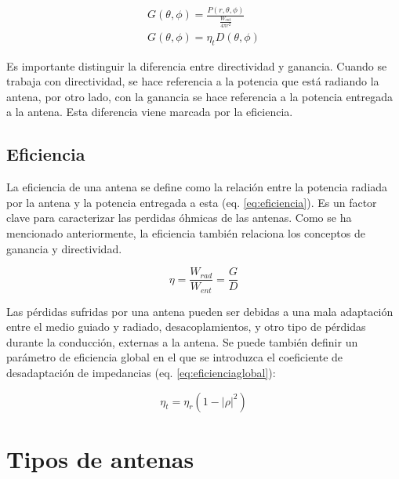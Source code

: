 \begin{subequations}
	\begin{eqnarray}
		G(\theta, \phi)=\frac{P(r,\theta, \phi)}{\frac{W_{ent}}{4\pi r^2}} \label{eq:ganancia} \\ %
		G(\theta, \phi)=\eta_{t} D(\theta, \phi) \label{eq:ganaciadirect}
	\end{eqnarray}
\end{subequations}

\par Es importante distinguir la diferencia entre directividad y ganancia. Cuando se trabaja con directividad, se hace referencia a la potencia que está radiando la antena, por otro lado, con la ganancia se hace referencia a la potencia entregada a la antena. Esta diferencia viene marcada por la eficiencia.

\subsection{Eficiencia}

\par La eficiencia de una antena se define como la relación entre la potencia radiada por la antena y la potencia entregada a esta (eq. \ref{eq:eficiencia}). Es un factor clave para caracterizar las perdidas óhmicas de las antenas. Como se ha mencionado anteriormente, la eficiencia también relaciona los conceptos de ganancia y directividad.

\begin{equation}
	\eta = \frac{W_{rad}}{W_{ent}}= \frac{G}{D}
	\label{eq:eficiencia}
\end{equation}

\par Las pérdidas sufridas por una antena pueden ser debidas a una mala adaptación entre el medio guiado y radiado, desacoplamientos, y otro tipo de pérdidas durante la conducción, externas a la antena. Se puede también definir un parámetro de eficiencia global en el que se introduzca el coeficiente de desadaptación de impedancias (eq. \ref{eq:eficienciaglobal}):

\begin{equation}
	\eta _{t}=\eta _{r}(1-\left | \rho  \right |^2)
	\label{eq:eficienciaglobal}
\end{equation}

\section{Tipos de antenas}

